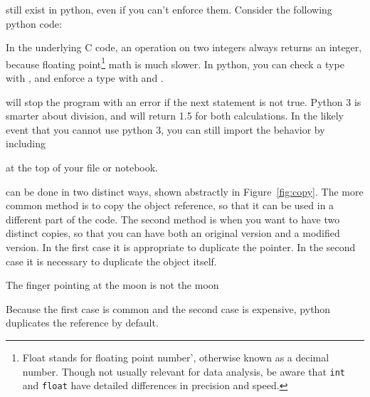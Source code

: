 \documentclass[justified, nobib]{tufte-handout}
\newcommand{\floatNote}{\footnote{ Float stands for floating
  point number', otherwise known as a decimal number. Though not usually
  relevant for data analysis, be aware that \texttt{int} and \texttt{float}
  have detailed differences in precision and speed.}}
\begin{document}
 still exist in python, even if you can't enforce
them. Consider the following python code:
\begin{adjustwidth}{2.0em}{0pt}

\end{adjustwidth}

\noindent
In the underlying C code, an operation on two integers always returns an
integer, because floating point\floatNote{} \;math is much slower. In python,
you can check a type with , and enforce a
type with  and .
\begin{adjustwidth}{2.0em}{0pt}

\end{adjustwidth}
 will stop the program with an error if the next statement is
not true. Python 3 is smarter about division, and will return 1.5 for both
calculations. In the likely event that you cannot use python 3, you can still
import the behavior by including
\begin{adjustwidth}{2.0em}{0pt}

\end{adjustwidth}
at the top of your file or notebook.

 can be done in two distinct ways, shown abstractly
in Figure~\ref*{fig:copy}. The more common method is to copy the object
reference, so that it can be used in a different part of the code. The second
method is when you want to have two distinct copies, so that you can have both
an original version and a modified version. In the first case it is appropriate
to duplicate the pointer. In the second case it is necessary to duplicate the
object itself.


\smallskip
\begin{marginfigure}
    \vspace*{\fill}
    \centering
    \subfloat[Case 1]{\scalebox{1}{}}

    \vfill

    \subfloat[Case 2]{\scalebox{0.69}{}}
  \caption{The finger pointing at the moon is not the moon}
\label{fig:copy}
\end{marginfigure}

\noindent
Because the first case is common and the second case is expensive, python
duplicates the reference by default.

\smallskip
\begin{adjustwidth}{2.0em}{0pt}
  
\end{adjustwidth}
\end{document}
